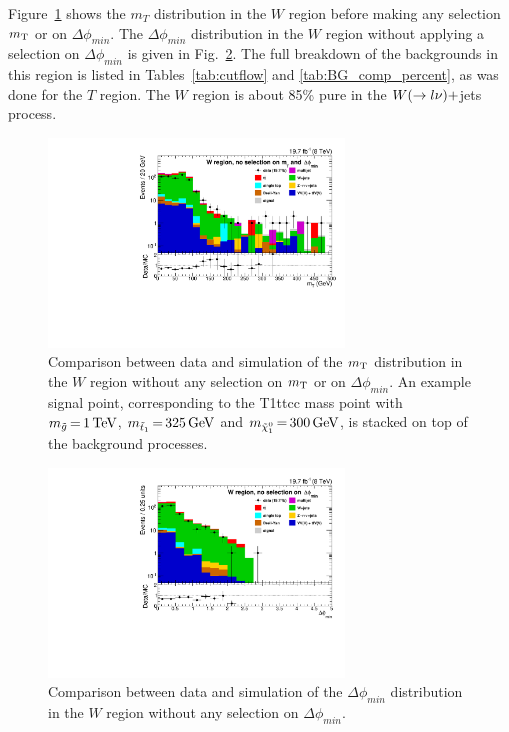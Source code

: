 Figure~\ref{fig:boost_W_region_mT} shows the $m_T$ distribution in the $W$ region before making any
selection $m_{\mathrm{T}}$ or on $\Delta\phi_{min}$. The $\Delta\phi_{min}$ distribution in the $W$ region
without applying a selection on $\Delta\phi_{min}$ is given in
Fig.~\ref{fig:boost_W_region_mindeltaphi}. The full breakdown of the backgrounds in this region is
listed in Tables~\ref{tab:cutflow} and \ref{tab:BG_comp_percent}, as was done for the $T$ region.
The $W$ region is about 85\% pure in the $W(\rightarrow l\nu)+$jets process. 

\begin{figure}[htbp]
\centering
\includegraphics[width=0.7\textwidth]{figures/razor_selection/plots/DataMC_mT_0Lbg1Y1Ll_rebin}
\caption{Comparison between data and simulation of the $m_{\mathrm{T}}$ distribution in the $W$ region without
any selection on $m_{\mathrm{T}}$ or on $\Delta\phi_{min}$. An example signal
point, corresponding to the T1ttcc mass point with $m_{\tilde{g}} \,{=}\, 1\,\text{Te\hspace{-.08em}V}$,
$m_{\tilde{t}_1} \,{=}\, 325\,\text{Ge\hspace{-.08em}V}$ and $m_{\tilde{\chi}_1^0} \,{=}\, 300\,\text{Ge\hspace{-.08em}V}$, is stacked on top of
the background processes.
\label{fig:boost_W_region_mT}}
\end{figure}

\begin{figure}[htbp]
\centering
\includegraphics[width=0.7\textwidth]
{figures/razor_selection/plots/DataMC_minDeltaPhi_0Lbg1Y1LlmT_rebin}
\caption{Comparison between data and simulation of the $\Delta\phi_{min}$ distribution in the $W$
region without any selection on $\Delta\phi_{min}$. 
\label{fig:boost_W_region_mindeltaphi}}
\end{figure}

